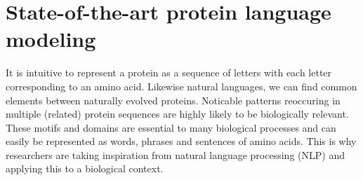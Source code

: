 \section{State-of-the-art protein language modeling}
It is intuitive to represent a protein as a sequence of letters with each letter corresponding to an amino acid. Likewise natural languages, we can find common elements between naturally evolved proteins. Noticable patterns reoccuring in multiple (related) protein sequences are highly likely to be biologically relevant. These motifs and domains are essential to many biological processes and can easily be represented as words, phrases and sentences of amino acids. This is why researchers are taking inspiration from natural language processing (NLP) and applying this to a biological context.